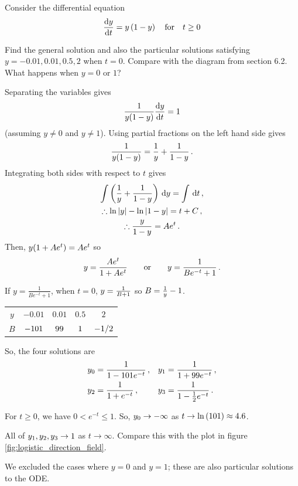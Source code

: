\goodbreak
\begin{example}[Lecture]
\label{ex:632}

Consider the differential equation
\[
\frac{{\rm d} y}{{\rm d} t}=y\left(1-y\right) \quad \text{for} \quad t\geq 0
\]

Find the general solution and also the particular solutions satisfying $y=-0.01, 0.01, 0.5 , 2$ when $t = 0$. Compare with the diagram from section 6.2. What happens when $y=0$ or $1$?

\end{example}
\begin{solution}


Separating the variables gives
\[
\frac{1}{y(1-y)}\frac{{\rm d} y}{{\rm d} t}=1
\]
(assuming $y\neq0$ and $y\neq1$). Using partial fractions on the left hand side gives
\[
\frac{1}{y(1-y)}=\frac{1}{y}+\frac{1}{1-y}\, .
\]
Integrating both sides with respect to $t$ gives
\begin{gather*}
\int\left(\frac{1}{y}+\frac{1}{1-y}\right)\, {\rm d}y=\int \, {\rm d}t\, ,\\
\therefore\ln|y|-\ln|1-y|=t+C\, ,\\
\therefore\frac{y}{1-y}=Ae^t\, .
\end{gather*}
Then, $y(1+Ae^t)=Ae^t$ so
\[
y=\frac{Ae^t}{1+Ae^t}\qquad\text{or}\qquad y=\frac{1}{Be^{-t}+1} \, .
\]


If $y=\frac{1}{Be^{-t}+1}$, when $t=0$, $y=\frac{1}{B+1}$ so $B=\frac{1}{y}-1$.
\begin{center}
\renewcommand{\arraystretch}{1.5}
\begin{tabular}{|c|c|c|c|c|}\hline
$y$ & $-0.01$ & $0.01$ & $0.5$ & $2$\\
$B$ & $-101$ & $99$ & $1$ & $-1/2$\\\hline
\end{tabular}
\end{center}
So, the four solutions are
\begin{align*}
y_0&=\frac{1}{1-101e^{-t}}\, ,&
y_1&=\frac{1}{1+99e^{-t}}\, ,\\
y_2&=\frac{1}{1+e^{-t}}\, ,&
y_3&=\frac{1}{1-\frac12e^{-t}}\, .
\end{align*}


For $t\geq0$, we have $0<{e}^{-t}\leq 1$. So, ${y}_{0}\to -\infty$ as $t\to \ln \left(101\right)\approx 4.6$.

All of ${y}_{1}, {y}_{2},{y}_{3}\to 1$ as $t\to \infty $. Compare this with the plot in figure \ref{fig:logistic_direction_field}.

We excluded the cases where $y=0$ and $y=1$; these are also particular solutions to the ODE. 
\end{solution}

